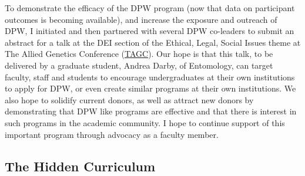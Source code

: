 \documentclass[11pt]{article}
\newcommand{\amy}[1]{{\color{amyCol} [\textbf{Amy:} #1]}}
\begin{document}
To demonstrate the efficacy of the DPW program (now that data on participant outcomes is becoming available), and increase the exposure and outreach of DPW, I initiated and then partnered with several DPW co-leaders to submit an abstract for a talk at the DEI section of the Ethical, Legal, Social Issues theme at The Allied Genetics Conference (\href{https://genetics-gsa.org/tagc-2020/}{TAGC}). Our hope is that this talk, to be delivered by a graduate student, Andrea Darby, of Entomology, can target faculty, staff and students to encourage undergraduates at their own institutions to apply for DPW, or even create similar programs at their own institutions. We also hope to solidify current donors, as well as attract new donors by demonstrating that DPW like programs are effective and that there is interest in such programs in the academic community. I hope to continue support of this important program through advocacy as a faculty member.  


\subsection*{The Hidden Curriculum}


\end{document}
